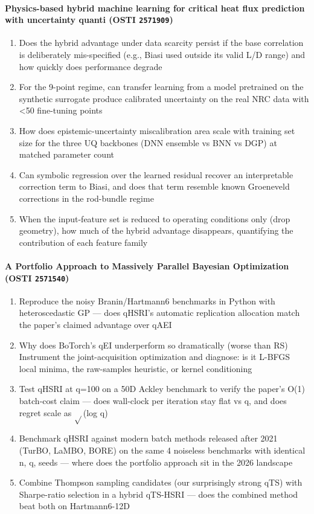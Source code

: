 \documentclass[11pt]{article}
\begin{document}
\paragraph{Physics-based hybrid machine learning for critical heat flux prediction with uncertainty quanti \textnormal{\small(OSTI \texttt{2571909})}}
\begin{enumerate}[leftmargin=1.6em,itemsep=0.2em,topsep=0.2em,label=Q\arabic*.]
\item Does the hybrid advantage under data scarcity persist if the base correlation is deliberately mis-specified (e.g., Biasi used outside its valid L/D range) and how quickly does performance degrade
\item For the 9-point regime, can transfer learning from a model pretrained on the synthetic surrogate produce calibrated uncertainty on the real NRC data with \textless{}50 fine-tuning points
\item How does epistemic-uncertainty miscalibration area scale with training set size for the three UQ backbones (DNN ensemble vs BNN vs DGP) at matched parameter count
\item Can symbolic regression over the learned residual recover an interpretable correction term to Biasi, and does that term resemble known Groeneveld corrections in the rod-bundle regime
\item When the input-feature set is reduced to operating conditions only (drop geometry), how much of the hybrid advantage disappears, quantifying the contribution of each feature family
\end{enumerate}
\paragraph{A Portfolio Approach to Massively Parallel Bayesian Optimization \textnormal{\small(OSTI \texttt{2571540})}}
\begin{enumerate}[leftmargin=1.6em,itemsep=0.2em,topsep=0.2em,label=Q\arabic*.]
\item Reproduce the noisy Branin/Hartmann6 benchmarks in Python with heteroscedastic GP --- does qHSRI's automatic replication allocation match the paper's claimed advantage over qAEI
\item Why does BoTorch's qEI underperform so dramatically (worse than RS) Instrument the joint-acquisition optimization and diagnose: is it L-BFGS local minima, the raw-samples heuristic, or kernel conditioning
\item Test qHSRI at q=100 on a 50D Ackley benchmark to verify the paper's O(1) batch-cost claim --- does wall-clock per iteration stay flat vs q, and does regret scale as $\sqrt{}$(log q)
\item Benchmark qHSRI against modern batch methods released after 2021 (TurBO, LaMBO, BORE) on the same 4 noiseless benchmarks with identical n, q, seeds --- where does the portfolio approach sit in the 2026 landscape
\item Combine Thompson sampling candidates (our surprisingly strong qTS) with Sharpe-ratio selection in a hybrid qTS-HSRI --- does the combined method beat both on Hartmann6-12D
\end{enumerate}
\end{document}
